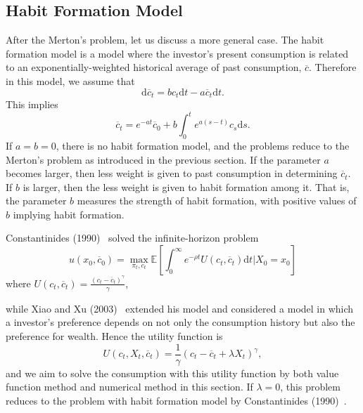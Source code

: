 \documentclass[a4paper]{article}
\theoremstyle{definition}
\numberwithin{equation}{section}
\begin{document}
\subsection{Habit Formation Model}
After the Merton's problem, let us discuss a more general case.
The habit formation model is a model where the investor's present consumption is related to an exponentially-weighted historical average of past consumption, $\overline c$.
Therefore in this model, we assume that
$$\mathrm d\overline c_t=bc_t\mathrm dt-a\overline c_t\mathrm dt.$$
This implies
$$\overline c_t=e^{-at}\overline c_0+b\int^t_0e^{a(s-t)}c_s\mathrm ds.$$
If $a=b=0$, there is no habit formation model, and the problems reduce to the Merton's problem as introduced in the previous section. If the parameter $a$ becomes larger, then less weight is given to past consumption in determining $\overline c_t$. If $b$ is larger, then the less weight is given to habit formation among it. That is, the parameter $b$ measures the strength of habit formation, with positive values of $b$ implying habit formation.

Constantinides (1990)~\cite{constantinides} solved the infinite-horizon problem
$$u(x_0,\overline c_0)=\max_{\pi_t,c_t}\mathbb E[\int^\infty_0e^{-\rho t}U(c_t,\overline c_t)\mathrm dt\lvert X_0=x_0]$$
where $U(c_t,\overline c_t)=\frac{(c_t-\overline c_t)^\gamma}{\gamma}$, %

while Xiao and Xu (2003)~\cite{c-i with wealth} extended his model and considered a model in which a investor's preference depends on not only the consumption history but also the preference for wealth. Hence the utility function is
\begin{equation}\label{problem with wealth2}
U(c_t,X_t,\overline c_t)=\frac{1}{\gamma}(c_t-\overline c_t+\lambda X_t)^\gamma,
\end{equation}
and we aim to solve the consumption with this utility function by both value function method and numerical method in this section.
If $\lambda=0$, this problem reduces to the problem with habit formation model by Constantinides (1990)~\cite{constantinides}.
\end{document}
